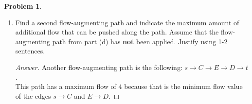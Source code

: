 \documentclass[11pt]{article}
\theoremstyle{definition}
\theoremstyle{definition}
\newtheorem{required}{Problem}
\theoremstyle{definition}
\begin{document}
\begin{required}
\begin{enumerate}[label=(\alph*)]
\vskip 10pt
\subsubsection{Problem 1\ref{e} (1 point)}
\item \label{e} Find a second flow-augmenting path and indicate the maximum amount of additional flow that can be pushed along the path. Assume that the flow-augmenting path from part (d) has \textbf{not} been applied. Justify using 1-2 sentences.

\begin{proof}[Answer]
Another flow-augmenting path is the following: $s \to C \to E \to D \to t$.\\ This path has a maximum flow of $4$ because that is the minimum flow value of the edges $s \to C$ and $E \to D$.
\end{proof}
\end{enumerate}
\end{required}
\end{document}
